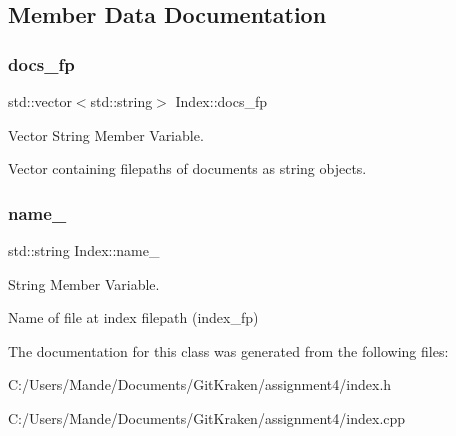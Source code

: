 \subsection{Member Data Documentation}
\mbox{\label{class_index_ab62d558f26d98409751e445a806a77b8}} 
\subsubsection{\texorpdfstring{docs\+\_\+fp}{docs\_fp}}
{\footnotesize\ttfamily std\+::vector$<$std\+::string$>$ Index\+::docs\+\_\+fp\hspace{0.3cm}{\ttfamily [private]}}



Vector String Member Variable. 

Vector containing filepaths of documents as string objects. \mbox{\label{class_index_a66c168cae41b8ad8a683163c34772b81}} 
\subsubsection{\texorpdfstring{name\+\_\+}{name\_}}
{\footnotesize\ttfamily std\+::string Index\+::name\+\_\+\hspace{0.3cm}{\ttfamily [private]}}



String Member Variable. 

Name of file at index filepath (index\+\_\+fp) 

The documentation for this class was generated from the following files\+:\begin{DoxyCompactItemize}
\item 
C\+:/\+Users/\+Mande/\+Documents/\+Git\+Kraken/assignment4/index.\+h\item 
C\+:/\+Users/\+Mande/\+Documents/\+Git\+Kraken/assignment4/index.\+cpp\end{DoxyCompactItemize}
